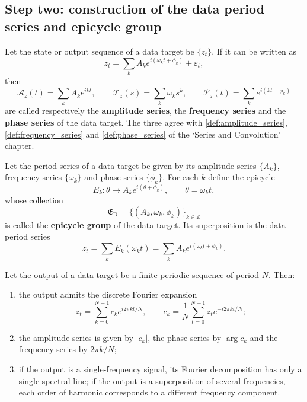 \subsection{Step two: construction of the data period series and epicycle group}

\begin{definition}\label{def:data_series}
Let the state or output sequence of a data target be $\{z_t\}$. If it can be written as
\[
z_t=\sum_k A_k e^{i(\omega_k t+\phi_k)}+\varepsilon_t,
\]
then
\[
\mathcal A_z(t)=\sum_k A_k e^{ikt},\qquad
\mathcal F_z(s)=\sum_k \omega_k s^k,\qquad
\mathcal P_z(t)=\sum_k e^{i(kt+\phi_k)}
\]
are called respectively the \textbf{amplitude series}, the \textbf{frequency series} and the \textbf{phase series} of the data target. The three agree with \cref{def:amplitude_series}, \cref{def:frequency_series} and \cref{def:phase_series} of the `Series and Convolution' chapter.
\end{definition}

\begin{definition}\label{def:data_epicycle_group}
Let the period series of a data target be given by its amplitude series $\{A_k\}$, frequency series $\{\omega_k\}$ and phase series $\{\phi_k\}$. For each $k$ define the epicycle
\[
E_k:\theta\mapsto A_k e^{i(\theta+\phi_k)},\qquad \theta=\omega_k t,
\]
whose collection
\[
\mathfrak E_{\mathrm{D}}=\{(A_k,\omega_k,\phi_k)\}_{k\in\mathbb Z}
\]
is called the \textbf{epicycle group} of the data target. Its superposition is the data period series
\[
z_t=\sum_k E_k(\omega_k t)=\sum_k A_k e^{i(\omega_k t+\phi_k)}.
\]
\end{definition}

\begin{theorem}\label{thm:data_series_reconstruction}
Let the output of a data target be a finite periodic sequence of period $N$. Then:
\begin{enumerate}[label=(\roman*)]
    \item the output admits the discrete Fourier expansion
    \[
    z_t=\sum_{k=0}^{N-1}c_k e^{i2\pi kt/N},\qquad
    c_k=\frac1N\sum_{t=0}^{N-1}z_t e^{-i2\pi kt/N};
    \]
    \item the amplitude series is given by $|c_k|$, the phase series by $\arg c_k$ and the frequency series by $2\pi k/N$;
    \item if the output is a single-frequency signal, its Fourier decomposition has only a single spectral line; if the output is a superposition of several frequencies, each order of harmonic corresponds to a different frequency component.
\end{enumerate}
\end{theorem}

